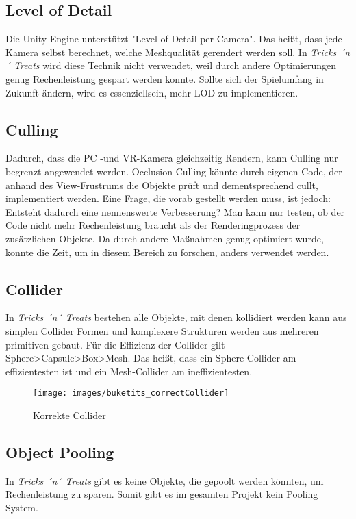 \subsection{Level of Detail}
Die Unity-Engine unterstützt "Level of Detail per Camera". Das heißt, dass jede Kamera selbst berechnet, welche Meshqualität gerendert werden soll. In \emph{Tricks ´n´ Treats} wird diese Technik nicht verwendet, weil durch andere Optimierungen genug Rechenleistung gespart werden konnte. Sollte sich der Spielumfang in Zukunft ändern, wird es essenziellsein, mehr LOD zu implementieren.

\subsection{Culling}
Dadurch, dass die PC -und VR-Kamera gleichzeitig Rendern, kann Culling nur begrenzt angewendet werden. Occlusion-Culling könnte durch eigenen Code, der anhand des View-Frustrums die Objekte prüft und dementsprechend cullt, implementiert werden. Eine Frage, die vorab gestellt werden muss, ist jedoch: Entsteht dadurch eine nennenswerte Verbesserung? Man kann nur testen, ob der Code nicht mehr Rechenleistung braucht als der Renderingprozess der zusätzlichen Objekte. Da durch andere Maßnahmen genug optimiert wurde, konnte die Zeit, um in diesem Bereich zu forschen, anders verwendet werden.

\subsection{Collider}
In \emph{Tricks ´n´ Treats} bestehen alle Objekte, mit denen kollidiert werden kann aus simplen Collider Formen und komplexere Strukturen werden aus mehreren primitiven gebaut. 
Für die Effizienz der Collider gilt Sphere>Capsule>Box>Mesh. Das heißt, dass ein Sphere-Collider am effizientesten ist und ein Mesh-Collider am ineffizientesten.

\begin{figure}[H]
	\centering
	\texttt{[image: images/buketits\_correctCollider]}
	\caption{Korrekte Collider}
\end{figure}

\subsection{Object Pooling}
In \emph{Tricks ´n´ Treats} gibt es keine Objekte, die gepoolt werden könnten, um Rechenleistung zu sparen. Somit gibt es im gesamten Projekt kein Pooling System.

